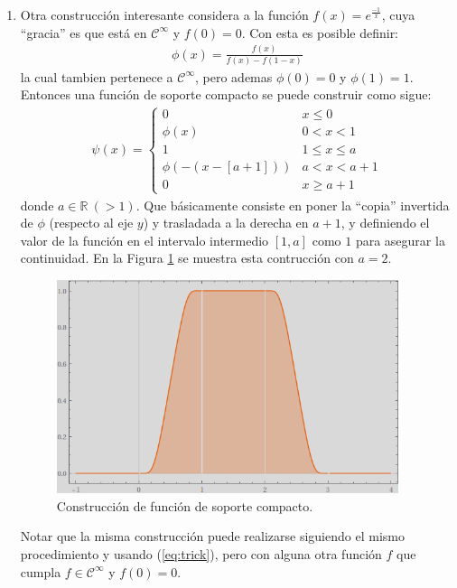 \documentclass[spanish, fleqn]{article}
\begin{document}
\begin{description}
\begin{enumerate}
	\item Otra construcción interesante considera a la función $\displaystyle f(x) = e^{\frac{-1}{x}}$, cuya ``gracia'' es que está en $\mathcal{C}^{\infty}$ y $f(0)=0$. Con esta es posible definir:
	\begin{align}
		\phi(x) = \frac{f(x)}{f(x)-f(1-x)}
	\label{eq:trick}
	\end{align}
	la cual tambien pertenece a $\mathcal{C}^{\infty}$, pero ademas $\phi(0)=0$ y $\phi(1)=1$. Entonces una función de soporte compacto se puede construir como sigue:
	\begin{align*}
		\psi(x) =
		\begin{cases}
		0 & x \leq 0 \\
		\phi(x) & 0 < x <1 \\
		1 & 1 \leq x \leq a \\
		\phi(-(x-[a+1])) & a < x < a+1 \\
		0 & x \geq a+1
		\end{cases}	
	\end{align*}
	donde $a \in \mathbb{R}\ (> 1)$. Que básicamente consiste en poner la ``copia'' invertida de $\phi$ (respecto al eje $y$) y trasladada a la derecha en $a+1$, y definiendo el valor de la función en el intervalo intermedio $[1,a]$ como $1$ para asegurar la continuidad. En la Figura \ref{fig:const} se muestra esta contrucción con $a=2$.
	\begin{figure}[htpb!]
	\centering
	\includegraphics[width=10cm]{construction}
	\caption{Construcción de función de soporte compacto.}
	\label{fig:const}
	\end{figure}
	
	Notar que la misma construcción puede realizarse siguiendo el mismo procedimiento y usando (\ref{eq:trick}), pero con
	alguna otra función $f$ que cumpla $f \in \mathcal{C}^{\infty}$ y $f(0)=0$.

	\end{enumerate}


\end{description}
\end{document}
